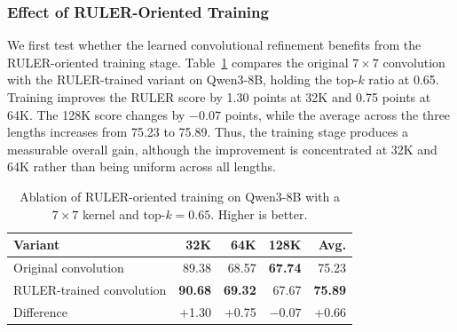 \subsubsection{Effect of RULER-Oriented Training}
\label{sec:training_ablation}

We first test whether the learned convolutional refinement benefits from the
RULER-oriented training stage. Table~\ref{tab:ruler_training_ablation}
compares the original $7\times7$ convolution with the RULER-trained variant on
Qwen3-8B, holding the top-$k$ ratio at 0.65. Training improves the RULER score
by 1.30 points at 32K and 0.75 points at 64K. The 128K score changes by
$-0.07$ points, while the average across the three lengths increases from
75.23 to 75.89. Thus, the training stage produces a measurable overall gain,
although the improvement is concentrated at 32K and 64K rather than being
uniform across all lengths.

\begin{table}[t]
    \centering
    \caption{
        Ablation of RULER-oriented training on Qwen3-8B with a $7\times7$
        kernel and top-$k=0.65$. Higher is better.
    }
    \label{tab:ruler_training_ablation}
    \small
    \begin{tabular}{lrrrr}
        \toprule
        Variant & 32K & 64K & 128K & Avg. \\
        \midrule
        Original convolution & 89.38 & 68.57 & \textbf{67.74} & 75.23 \\
        RULER-trained convolution & \textbf{90.68} & \textbf{69.32} & 67.67 & \textbf{75.89} \\
        \midrule
        Difference & +1.30 & +0.75 & $-0.07$ & +0.66 \\
        \bottomrule
    \end{tabular}
\end{table}

